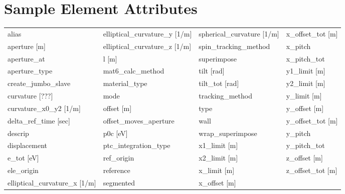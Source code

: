 \section{Sample Element Attributes}
 \label{s:list.sample}
 
 \begin{tabular}{llll} \toprule
alias                            & elliptical_curvature_y [1/m]     & spherical_curvature [1/m]        & x_offset_tot [m]                 \\
aperture [m]                     & elliptical_curvature_z [1/m]     & spin_tracking_method             & x_pitch                          \\
aperture_at                      & l [m]                            & superimpose                      & x_pitch_tot                      \\
aperture_type                    & mat6_calc_method                 & tilt [rad]                       & y1_limit [m]                     \\
create_jumbo_slave               & material_type                    & tilt_tot [rad]                   & y2_limit [m]                     \\
curvature [???]                  & mode                             & tracking_method                  & y_limit [m]                      \\
curvature_x0_y2 [1/m]            & offset [m]                       & type                             & y_offset [m]                     \\
delta_ref_time [sec]             & offset_moves_aperture            & wall                             & y_offset_tot [m]                 \\
descrip                          & p0c [eV]                         & wrap_superimpose                 & y_pitch                          \\
displacement                     & ptc_integration_type             & x1_limit [m]                     & y_pitch_tot                      \\
e_tot [eV]                       & ref_origin                       & x2_limit [m]                     & z_offset [m]                     \\
ele_origin                       & reference                        & x_limit [m]                      & z_offset_tot [m]                 \\
elliptical_curvature_x [1/m]     & segmented                        & x_offset [m]                     &                                  \\
 \bottomrule
 \end{tabular}
 \vfill
 
